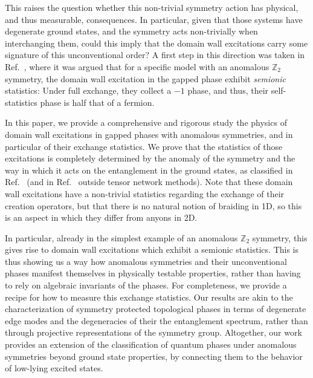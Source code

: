 \documentclass[aps,pra,export,nofootinbib]{revtex4-2}
\begin{document}
This raises the question whether this non-trivial symmetry action has
physical, and thus measurable, consequences.  In particular, given that
those systems have degenerate ground states, and the symmetry acts
non-trivially when interchanging them, could this imply that the domain
wall excitations carry some signature of this unconventional order?  A
first step in this direction was taken in Ref.~\cite{Roose19}, where it was
argued that for a specific model with an anomalous $\mathbb Z_2$ symmetry, the domain wall excitation in
the gapped phase exhibit \emph{semionic} statistics: Under full
exchange, they collect a $-1$ phase, and thus, their self-statistics phase
is half that of a fermion.

In this paper, we provide a comprehensive and rigorous study the physics of domain wall excitations in gapped phases with anomalous symmetries, and in particular of their exchange statistics. We prove that the statistics of those excitations is completely determined by the anomaly of the symmetry and the way in which it acts on the entanglement in the ground states, as classified in Ref.~\cite{Garre22} (and in Ref.~\cite{Garre24} outside tensor network methods). Note that these domain wall excitations have a non-trivial statistics regarding the exchange of their creation operators, but that there is no natural notion of braiding in 1D, so this is an aspect in which they differ from anyons in 2D.


In particular, already in the simplest example of an anomalous $\mathbb Z_2$ symmetry, this gives rise to domain wall excitations which exhibit a semionic statistics. This is thus showing  us a way how anomalous symmetries and their unconventional phases manifest themselves in physically testable properties, rather than having to rely on
algebraic invariants of the phases. For completeness, we provide a recipe for how to measure this exchange statistics. Our results are akin to the
characterization of symmetry protected topological phases in terms of degenerate edge modes and the degeneracies of their the entanglement spectrum, rather than through projective representations of the symmetry group. Altogether, our work provides an extension of the classification of quantum phases under anomalous symmetries beyond ground state properties, by connecting them to the behavior of low-lying excited states.
\end{document}
